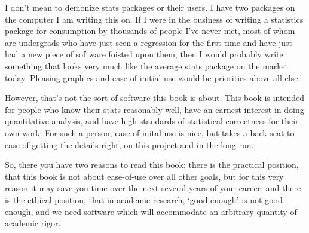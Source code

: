 I don't mean to demonize stats packages or their users. I have two
packages on the computer I am writing this on. If I
were in the business of writing a statistics package for consumption by
thousands of people I've never met, most of whom are undergrads who have
just seen a regression for the first time and have just had a new piece
of software foisted upon them, then I would probably write something
that looks very much like the average stats package on the market today.
Pleasing graphics and ease of initial use would be priorities above all else.

However, that's not the sort of software this book is about.
This book is intended for people who know their stats reasonably well,
have an earnest interest in doing quantitative analysis, and have
high standards of statistical correctness for their own work. For such a
person, ease of inital use is nice, but takes a back seat to ease of
getting the details right, on this project and in the long run.

So, there you have two reasons to read this book: there is the practical
position, that this book is not about ease-of-use over all other goals,
but for this very reason it may save you time over the next several
years of your career; and there is the ethical position, that in academic
research, `good enough' is not good enough, and we need software which
will accommodate an arbitrary quantity of academic rigor.
